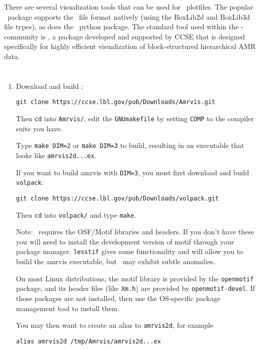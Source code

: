 There are several visualization tools that can be used for \amrex\
plotfiles.  The popular \visit\ package supports the \amrex\ file 
format natively (using the {\sf BoxLib2d} and {\sf BoxLib3d} file types),
as does the \yt\ python package.  The standard tool used within the
\amrex-community is \amrvis, a package developed and supported 
by CCSE that is designed specifically for highly efficient visualization
of block-structured hierarchical AMR data.

\section{\amrvis}

\begin{enumerate}

\item Download and build \amrvis:
\begin{verbatim}
git clone https://ccse.lbl.gov/pub/Downloads/Amrvis.git
\end{verbatim}

Then {\tt cd} into {\tt Amrvis/}, edit the {\tt GNUmakefile} by
setting {\tt COMP} to the compiler suite you have.

Type {\tt make DIM=2} or {\tt make DIM=3} to build, 
resulting in an executable that looks like {\tt amrvis2d...ex}.

If you want to build amrvis with {\tt DIM=3}, you must first
download and build {\tt volpack}:
\begin{verbatim}
git clone https://ccse.lbl.gov/pub/Downloads/volpack.git
\end{verbatim}

Then {\tt cd} into {\tt volpack/} and type {\tt make}.

Note: \amrvis\ requires the OSF/Motif libraries and headers. If you don't have these 
you will need to install the development version of motif through your package manager. 
{\tt lesstif} gives some functionality and will allow you to build the amrvis executable, 
but \amrvis\ may exhibit subtle anomalies.

On most Linux distributions, the motif library is provided by the
{\tt openmotif} package, and its header files (like {\tt Xm.h}) are provided
by {\tt openmotif-devel}. If those packages are not installed, then use the
OS-specific package management tool to install them. 

You may then want to create an alias to {\tt amrvis2d}, for example
\begin{verbatim}
alias amrvis2d /tmp/Amrvis/amrvis2d...ex
\end{verbatim}


\end{enumerate}

